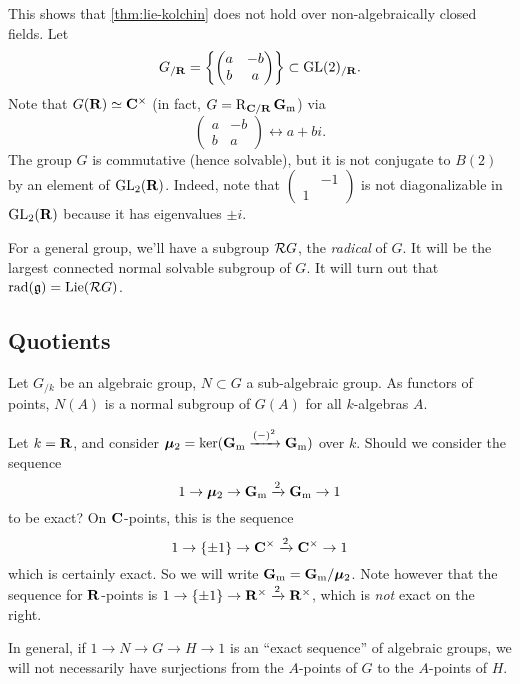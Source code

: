 \begin{example}
This shows that \autoref{thm:lie-kolchin} does not hold over non-algebraically closed 
fields. Let 
\[
  G_{/\mathbf{R}} = \left\{\begin{pmatrix} a & -b \\ b & a \end{pmatrix}\right\}\subset \operatorname{GL}(2)_{/\mathbf{R}} .
\]
Note that $G(\mathbf{R})\simeq \mathbf{C}^\times$ (in fact, $G=\operatorname{R}_{\mathbf{C}/\mathbf{R}} \mathbf{G}_\mathrm{m}$) via 
\[
  \begin{pmatrix} a & -b \\ b & a \end{pmatrix} \leftrightarrow a+ b i .
\]
The group $G$ is commutative (hence solvable), but it is not conjugate to 
$B(2)$ by an element of $\operatorname{GL}_2(\mathbf{R})$. Indeed, note that 
$\begin{pmatrix} & -1 \\ 1 \end{pmatrix}$ is not diagonalizable in $\operatorname{GL}_2(\mathbf{R})$ 
because it has eigenvalues $\pm i$. 
\end{example}

For a general group, we'll have a subgroup $\mathcal{R} G$, the \emph{radical} of 
$G$. It will be the largest connected normal solvable subgroup of $G$. It 
will turn out that $\operatorname{rad}(\mathfrak{g}) = \operatorname{Lie}(\mathcal{R} G)$. 





\subsection{Quotients}

Let $G_{/k}$ be an algebraic group, $N\subset G$ a sub-algebraic group. As 
functors of points, $N(A)$ is a normal subgroup of $G(A)$ for all $k$-algebras 
$A$. 

\begin{example}
Let $k=\mathbf{R}$, and consider $\bm{\mu}_2=\ker(\mathbf{G}_\mathrm{m}\xrightarrow{(-)^2}\mathbf{G}_\mathrm{m})$ over $k$. 
Should we consider the sequence 
\[
  1\to \bm{\mu}_2\to \mathbf{G}_\mathrm{m}\xrightarrow 2 \mathbf{G}_\mathrm{m} \to 1 
\]
to be exact? On $\mathbf{C}$-points, this is the sequence 
\[
  1\to \{\pm 1\} \to \mathbf{C}^\times \xrightarrow 2 \mathbf{C}^\times \to 1
\]
which is certainly exact. So we will write $\mathbf{G}_\mathrm{m}=\mathbf{G}_\mathrm{m}/\bm{\mu}_2$. Note however 
that the sequence for $\mathbf{R}$-points is 
$1\to \{\pm 1\}\to \mathbf{R}^\times \xrightarrow 2 \mathbf{R}^\times$, which is \emph{not} 
exact on the right. 
\end{example}

In general, if $1\to N\to G\to H\to 1$ is an ``exact sequence'' of algebraic 
groups, we will not necessarily have surjections from the $A$-points of $G$ to 
the $A$-points of $H$. 

